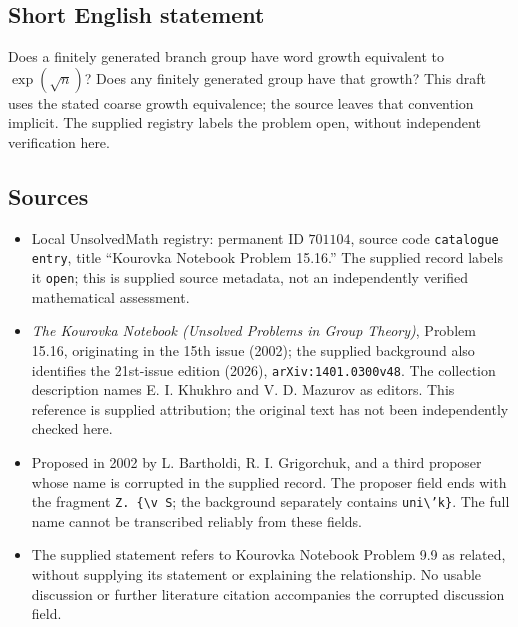 \documentclass[11pt]{article}
\begin{document}
\subsection{Short English statement}
Does a finitely generated branch group have word growth equivalent to \(\exp(\sqrt n)\)? Does any finitely generated group have that growth? This draft uses the stated coarse growth equivalence; the source leaves that convention implicit. The supplied registry labels the problem open, without independent verification here.
\subsection{Sources}
\begin{itemize}
\item Local UnsolvedMath registry: permanent ID \(701104\), source code \texttt{catalogue entry}, title ``Kourovka Notebook Problem 15.16.'' The supplied record labels it \texttt{open}; this is supplied source metadata, not an independently verified mathematical assessment.
\item \emph{The Kourovka Notebook (Unsolved Problems in Group Theory)}, Problem 15.16, originating in the 15th issue (2002); the supplied background also identifies the 21st-issue edition (2026), \texttt{arXiv:1401.0300v48}. The collection description names E. I. Khukhro and V. D. Mazurov as editors. This reference is supplied attribution; the original text has not been independently checked here.
\item Proposed in 2002 by L. Bartholdi, R. I. Grigorchuk, and a third proposer whose name is corrupted in the supplied record. The proposer field ends with the fragment \texttt{Z. \{\textbackslash v S}; the background separately contains \texttt{uni\textbackslash 'k\}}. The full name cannot be transcribed reliably from these fields.
\item The supplied statement refers to Kourovka Notebook Problem 9.9 as related, without supplying its statement or explaining the relationship. No usable discussion or further literature citation accompanies the corrupted discussion field.
\end{itemize}
\end{document}
